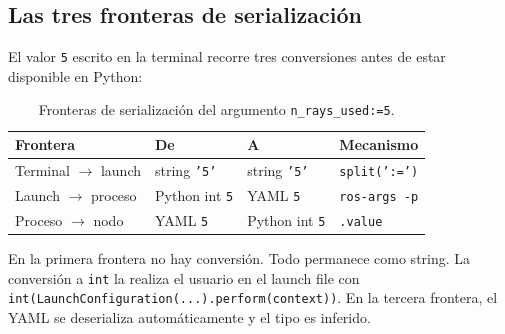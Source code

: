 \subsection{Las tres fronteras de serialización}

El valor \texttt{5} escrito en la terminal recorre tres conversiones antes de estar disponible en Python:

\begin{table}[H]
  \centering
  \caption{Fronteras de serialización del argumento \texttt{n\_rays\_used:=5}.}
  \label{tab:fronteras}
  \begin{tabular}{llll}
    \toprule
    Frontera & De & A & Mecanismo \\
    \midrule
    Terminal $\to$ launch & string \texttt{'5'} & string \texttt{'5'} & \texttt{split(':=')} \\
    Launch $\to$ proceso  & Python int \texttt{5}  & YAML \texttt{5} & \texttt{ros-args -p} \\
    Proceso $\to$ nodo    & YAML \texttt{5} & Python int \texttt{5} & \texttt{.value} \\
    \bottomrule
  \end{tabular}
\end{table}

En la primera frontera no hay conversión. Todo permanece como string. La conversión a \texttt{int} la realiza el usuario en el launch file con \texttt{int(LaunchConfiguration(...).perform(context))}. En la tercera frontera, el YAML se deserializa automáticamente y el tipo es inferido.
